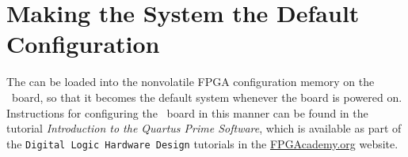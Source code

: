 \section{Making the System the Default Configuration}
\label{sec:systempof}

The {\it \systemNameFull} can be loaded into the nonvolatile FPGA configuration memory on the
\DEBoard~board, so that it becomes the default system whenever the board is powered on.
Instructions for configuring the \DEBoard~board in this manner can be found in the tutorial
{\it Introduction to the Quartus Prime Software}, which is available as part of the
\texttt{Digital Logic Hardware Design} tutorials in the 
{\small \href{https://www.fpgacademy.org/tutorials.html} {FPGAcademy.org}} website.


